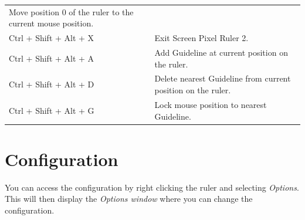 \documentclass[
]{book}
\begin{document}
\begin{longtable}[]{@{}ll@{}}
\begin{minipage}[t]{0.68\columnwidth}
Move position 0 of the ruler to the current mouse position.\strut
\end{minipage}\tabularnewline
\begin{minipage}[t]{0.27\columnwidth}\raggedright
Ctrl + Shift + Alt + X\strut
\end{minipage} & \begin{minipage}[t]{0.68\columnwidth}\raggedright
Exit Screen Pixel Ruler 2.\strut
\end{minipage}\tabularnewline
\begin{minipage}[t]{0.27\columnwidth}\raggedright
Ctrl + Shift + Alt + A\strut
\end{minipage} & \begin{minipage}[t]{0.68\columnwidth}\raggedright
Add Guideline at current position on the ruler.\strut
\end{minipage}\tabularnewline
\begin{minipage}[t]{0.27\columnwidth}\raggedright
Ctrl + Shift + Alt + D\strut
\end{minipage} & \begin{minipage}[t]{0.68\columnwidth}\raggedright
Delete nearest Guideline from current position on the ruler.\strut
\end{minipage}\tabularnewline
\begin{minipage}[t]{0.27\columnwidth}\raggedright
Ctrl + Shift + Alt + G\strut
\end{minipage} & \begin{minipage}[t]{0.68\columnwidth}\raggedright
Lock mouse position to nearest Guideline.\strut
\end{minipage}\tabularnewline
\bottomrule
\end{longtable}

\hypertarget{config}{%
\chapter{Configuration}\label{config}}

You can access the configuration by right clicking the ruler and selecting \emph{Options}.
This will then display the \emph{Options window} where you can change the configuration.
\end{document}
